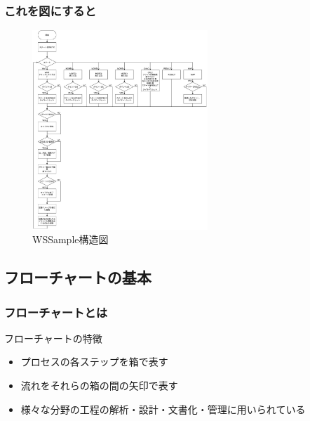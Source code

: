 \documentclass[10pt, dvipdfmx]{beamer}
\begin{document}
    \begin{frame}
    \end{frame}

        \begin{frame}
            \frametitle{これを図にすると}
            \begin{figure}[htb]
                 \includegraphics[height=75mm]{images/WSSampleFlowChart.jpg}
                 \caption{WSSample構造図}
                \label{fig:03}
            \end{figure}
        \end{frame}

        \begin{frame}
        \end{frame}

    \subsection{フローチャートの基本}
        \begin{frame}
            \frametitle{フローチャートとは}
            \begin{block}{フローチャートの特徴}
                \begin{itemize}
                    \item プロセスの各ステップを箱で表す
                    \item 流れをそれらの箱の間の矢印で表す
                    \item 様々な分野の工程の解析・設計・文書化・管理に用いられている
                \end{itemize}
            \end{block}
        \end{frame}
\end{document}

